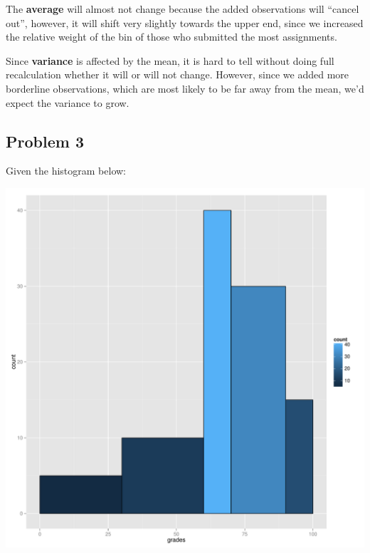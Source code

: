 \documentclass[11pt]{article}
\begin{document}
The \textbf{average} will almost not change because the added observations will
``cancel out'', however, it will shift very slightly towards the upper
end, since we increased the relative weight of the bin of those who
submitted the most assignments.

Since \textbf{variance} is affected by the mean, it is hard to tell without
doing full recalculation whether it will or will not change.  However,
since we added more borderline observations, which are most likely to
be far away from the mean, we'd expect the variance to grow.
\subsection{Problem 3}
\label{sec-1-3}
Given the histogram below:


\includegraphics[width=.9\linewidth]{images/exam.pdf}
\end{document}
